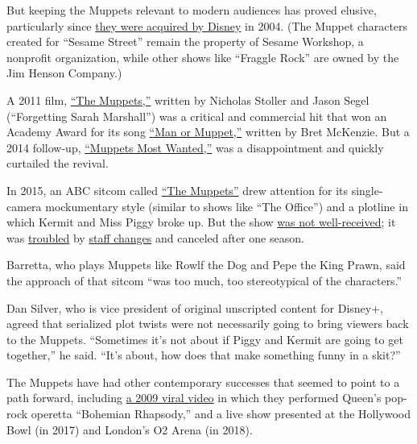 But keeping the Muppets relevant to modern audiences has proved elusive,
particularly since
\href{https://www.nytimes.com/2004/02/18/business/kermit-and-miss-piggy-join-stable-of-walt-disney-stars.html?searchResultPosition=7}{they
were acquired by Disney} in 2004. (The Muppet characters created for
``Sesame Street'' remain the property of Sesame Workshop, a nonprofit
organization, while other shows like ``Fraggle Rock'' are owned by the
Jim Henson Company.)

A 2011 film, \href{https://www.youtube.com/watch?v=bUuh2Ku9PpQ}{``The
Muppets,''} written by Nicholas Stoller and Jason Segel (``Forgetting
Sarah Marshall'') was a critical and commercial hit that won an Academy
Award for its song
\href{https://www.youtube.com/watch?v=cRTjksM3YAs}{``Man or Muppet,''}
written by Bret McKenzie. But a 2014 follow-up,
\href{https://www.youtube.com/watch?v=CpXEfNU8Qwk}{``Muppets Most
Wanted,''} was a disappointment and quickly curtailed the revival.

In 2015, an ABC sitcom called
\href{https://www.youtube.com/watch?v=nU2Ec5_3E2s}{``The Muppets''} drew
attention for its single-camera mockumentary style (similar to shows
like ``The Office'') and a plotline in which Kermit and Miss Piggy broke
up. But the show
\href{https://www.nytimes.com/2015/09/22/arts/television/review-muppets-abc-kermit-ms-piggy.html?searchResultPosition=4}{was
not well-received}; it was
\href{https://deadline.com/2015/11/the-muppets-showrunner-bob-kushell-exit-kristin-newman-reboot-1201606360/}{troubled}
by
\href{https://www.hollywoodreporter.com/news/disney-says-fired-kermit-frog-actor-unacceptable-business-conduct-1021701}{staff
changes} and canceled after one season.

Barretta, who plays Muppets like Rowlf the Dog and Pepe the King Prawn,
said the approach of that sitcom ``was too much, too stereotypical of
the characters.''

Dan Silver, who is vice president of original unscripted content for
Disney+, agreed that serialized plot twists were not necessarily going
to bring viewers back to the Muppets. ``Sometimes it's not about if
Piggy and Kermit are going to get together,'' he said. ``It's about, how
does that make something funny in a skit?''

The Muppets have had other contemporary successes that seemed to point
to a path forward, including
\href{https://www.youtube.com/watch?v=tgbNymZ7vqY}{a 2009 viral video}
in which they performed Queen's pop-rock operetta ``Bohemian Rhapsody,''
and a live show presented at the Hollywood Bowl (in 2017) and London's
O2 Arena (in 2018).

